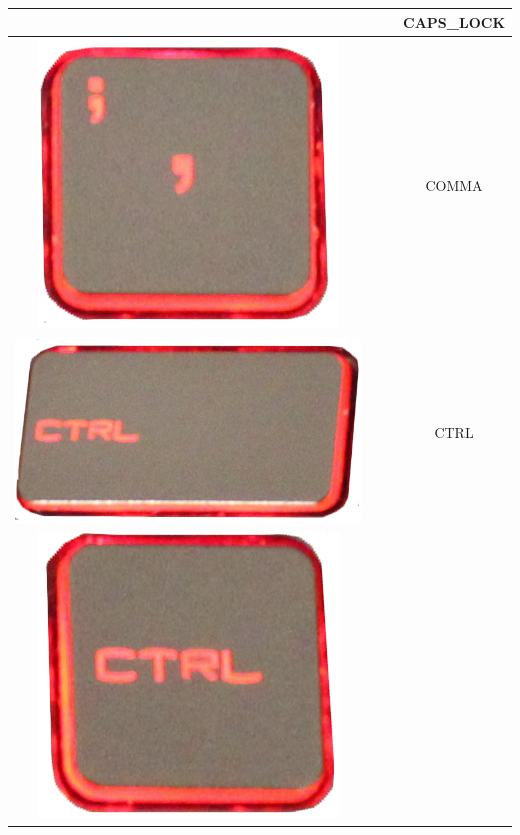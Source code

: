 \begin{longtable}{cccc}
\begin{minipage}[c]{.3\textwidth}
\vspace{0.2cm}
\end{minipage} & & & CAPS\_LOCK\\
\hline
\begin{minipage}[c]{.3\textwidth}
\vspace{0.2cm}
\includegraphics[scale=0.1]{Images/KeyMapping/COMMA}
\vspace{0.2cm}
\end{minipage} & & & COMMA\\
\hline
\begin{minipage}[c]{.3\textwidth}
\vspace{0.2cm}
\includegraphics[scale=0.1]{Images/KeyMapping/CTRL}
\vspace{0.2cm}
\end{minipage} & & & CTRL\\
\hline
\begin{minipage}[c]{.3\textwidth}
\vspace{0.2cm}
\includegraphics[scale=0.1]{Images/KeyMapping/CTRL_R}

\end{minipage}
\end{longtable}
